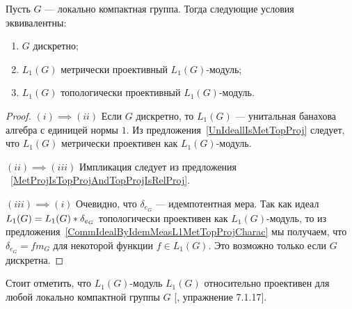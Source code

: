 \begin{theorem}\label{L1ModL1MetTopProjCharac} Пусть $G$ --- локально компактная
группа. Тогда следующие условия эквивалентны:

\begin{enumerate}[label = (\roman*)]
    \item $G$ дискретно;

    \item $L_1(G)$ метрически проективный $L_1(G)$-модуль;

    \item $L_1(G)$ топологически проективный $L_1(G)$-модуль.
\end{enumerate}
\end{theorem}
\begin{proof} $(i) \implies (ii)$ Если $G$ дискретно, то $L_1(G)$ ---
унитальная банахова алгебра с единицей нормы $1$. Из
предложения~\ref{UnIdeallIsMetTopProj} следует, что $L_1(G)$ метрически
проективен как $L_1(G)$-модуль.

$(ii) \implies (iii)$ Импликация следует из предложения
~\ref{MetProjIsTopProjAndTopProjIsRelProj}.

$(iii) \implies (i)$ Очевидно, что $\delta_{e_G}$ --- идемпотентная мера. Так
как идеал $L_1(G)=L_1(G)\ast \delta_{e_G}$ топологически проективен как
$L_1(G)$-модуль, то из предложения~\ref{CommIdealByIdemMeasL1MetTopProjCharac}
мы получаем, что $\delta_{e_G}=f m_G$ для некоторой функции $f\in L_1(G)$. Это
возможно только если $G$ дискретна.
\end{proof}

Стоит отметить, что $L_1(G)$-модуль $L_1(G)$ относительно проективен для любой
локально компактной группы $G$ [\cite{HelBanLocConvAlg}, упражнение 7.1.17].

